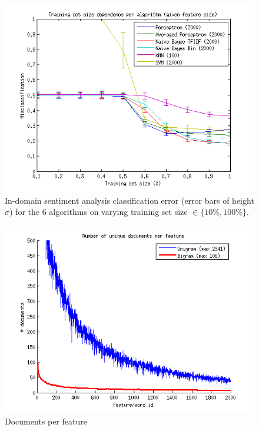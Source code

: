 \begin{figure}[H]
\centering
\includegraphics[scale = 1]{../Plottar/training_size_k_2000allknn_100.png}
\caption{In-domain sentiment analysis classification error (error bars of height $\sigma$) for the 6 algorithms on varying training set size $\in \{10\%, 100\%\}$.}
\end{figure} 

\begin{figure}[H]
\centering
\includegraphics[scale = 1]{../Plottar/documents_per_feature.png}
\caption{Documents per feature}
\end{figure} 


